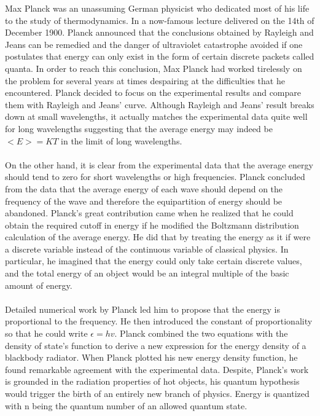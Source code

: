 \documentclass[fleqn]{article}
\begin{document}
\begin{enumerate}
{        Max Planck was an unassuming German physicist who dedicated most of his life to the study of thermodynamics. In a now-famous lecture delivered on the 14th of December 1900. Planck announced that the conclusions obtained by Rayleigh and Jeans can be remedied and the danger of ultraviolet catastrophe avoided if one postulates that energy can only exist in the form of certain discrete packets called quanta. In order to reach this conclusion, Max Planck had worked tirelessly on the problem for several years at times despairing at the difficulties that he encountered. Planck decided to focus on the experimental results and compare them with Rayleigh and Jeans’ curve. Although Rayleigh and Jeans’ result breaks down at small wavelengths, it actually matches the experimental data quite well for long wavelengths suggesting that the average energy may indeed be $<E>=KT$ in the limit of long wavelengths. \\ \\
        On the other hand, it is clear from the experimental data that the average energy should tend to zero for short wavelengths or high frequencies. Planck concluded from the data that the average energy of each wave should depend on the frequency of the wave and therefore the equipartition of energy should be abandoned. Planck’s great contribution came when he realized that he could obtain the required cutoff in energy if he modified the Boltzmann distribution calculation of the average energy. He did that by treating the energy as it if were a discrete variable instead of the continuous variable of classical physics. In particular, he imagined that the energy could only take certain discrete values, and the total energy of an object would be an integral multiple of the basic amount of energy. \\ \\ 
        Detailed numerical work by Planck led him to propose that the energy is proportional to the frequency. He then introduced the constant of proportionality so that he could write $\epsilon=hv$. Planck combined the two equations with the density of state’s function to derive a new expression for the energy density of a blackbody radiator. When Planck plotted his new energy density function, he found remarkable agreement with the experimental data.
        Despite, Planck’s work is grounded in the radiation properties of hot objects, his quantum hypothesis would trigger the birth of an entirely new branch of physics. Energy is quantized with n being the quantum number of an allowed quantum state. \\ \\
}
\end{enumerate}
\end{document}
